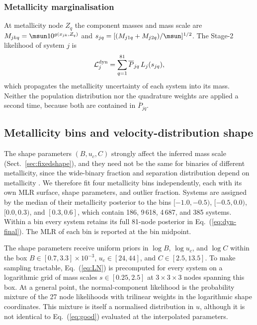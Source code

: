 \subsubsection{Metallicity marginalisation}

At metallicity node $Z_q$ the component masses and mass scale are
$M_{jkq}=\msun10^{g(x_{jk},Z_q)}$ and
$s_{jq}=[(M_{j1q}+M_{j2q})/\msun]^{1/2}$.  The Stage-2 likelihood of system
$j$ is
\begin{equation}
 \mathcal L_j^{\rm dyn}=\sum_{q=1}^{81}\overline P_{jq}\,L_j(s_{jq}),
 \label{eq:dyn-final}
\end{equation}
which propagates the metallicity uncertainty of each system into its mass.
Neither the population distribution nor the quadrature weights are applied a
second time, because both are contained in $\overline P_{jq}$.

\subsection{Metallicity bins and velocity-distribution shape}
\label{sec:bins}

The shape parameters $(B,u_c,C)$ strongly affect the inferred mass scale
(Sect.~\ref{sec:fixedshape}), and they need not be the same for binaries of
different metallicity, since the wide-binary fraction and separation
distribution depend on metallicity \citep{Hwang2021}.  We therefore fit four
metallicity bins independently, each with its own MLR surface, shape
parameters, and outlier fraction.  Systems are assigned by the median of
their metallicity posterior to the bins $[-1.0,-0.5)$, $[-0.5,0.0)$,
$[0.0,0.3)$, and $[0.3,0.6]$, which contain 186, 9\,618, 4\,687, and 385
systems.  Within a bin every system retains its full 81-node posterior in
Eq.~(\ref{eq:dyn-final}).  The MLR of each bin is reported at the bin
midpoint.

The shape parameters receive uniform priors in $\log B$, $\log u_c$, and
$\log C$ within the box $B\in[0.7,3.3]\times10^{-3}$, $u_c\in[24,44]$, and
$C\in[2.5,13.5]$.  To make sampling tractable, Eq.~(\ref{eq:LN}) is
precomputed for every system on a logarithmic grid of mass scales
$s\in[0.25,2.5]$ at $3\times3\times3$ nodes spanning this box.  At a general
point, the normal-component likelihood is the probability mixture of the 27
node likelihoods with trilinear weights in the logarithmic shape coordinates.
This mixture is itself a normalised distribution in $u$, although it is not
identical to Eq.~(\ref{eq:good}) evaluated at the interpolated parameters.

